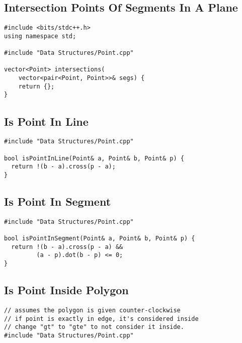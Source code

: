 \documentclass[twoside]{article}
\begin{document}
\begin{multicols*}{2}
\subsectionfont{\large\bfseries\sffamily\underline}
\subsection*{Intersection Points Of Segments In A Plane}
\begin{verbatim}
#include <bits/stdc++.h>
using namespace std;

#include "Data Structures/Point.cpp"

vector<Point> intersections(
    vector<pair<Point, Point>>& segs) {
    return {};
}
\end{verbatim}

\subsectionfont{\large\bfseries\sffamily\underline}
\subsection*{Is Point In Line}
\begin{verbatim}
#include "Data Structures/Point.cpp"

bool isPointInLine(Point& a, Point& b, Point& p) {
  return !(b - a).cross(p - a);
}
\end{verbatim}

\subsectionfont{\large\bfseries\sffamily\underline}
\subsection*{Is Point In Segment}
\begin{verbatim}
#include "Data Structures/Point.cpp"

bool isPointInSegment(Point& a, Point& b, Point& p) {
  return !(b - a).cross(p - a) &&
         (a - p).dot(b - p) <= 0;
}
\end{verbatim}

\subsectionfont{\large\bfseries\sffamily\underline}
\subsection*{Is Point Inside Polygon}
\begin{verbatim}
// assumes the polygon is given counter-clockwise
// if point is exactly in edge, it's considered inside
// change "gt" to "gte" to not consider it inside.
#include "Data Structures/Point.cpp"


\end{verbatim}
\end{multicols*}
\end{document}
